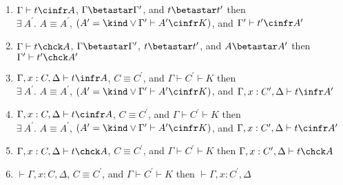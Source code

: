 \begin{theorem}
\begin{enumerate}
        \item $\Gamma \vdash t \cinfr A$, $\Gamma \betastar \Gamma^\prime$, and $t \betastar t^\prime$ then \\ $\exists\ A^\prime.$ $A \equiv A^\prime$, $(A^\prime = \kind \vee \Gamma^\prime \vdash A^\prime \cinfr K)$, and $\Gamma^\prime \vdash t^\prime \cinfr A^\prime$
        \item $\Gamma \vdash t \chck A$, $\Gamma \betastar \Gamma^\prime$, $t \betastar t^\prime$, and $A \betastar A^\prime$ then $\Gamma^\prime \vdash t^\prime \chck A^\prime$
        \item $\Gamma, x : C, \Delta \vdash t \infr A$, $C \equiv C^\prime$, and $\Gamma \vdash C^\prime \vdash K$ then \\ $\exists\ A^\prime.$ $A \equiv A^\prime$, $(A^\prime = \kind \vee \Gamma^\prime \vdash A^\prime \cinfr K)$, and $\Gamma, x : C^\prime, \Delta \vdash t\infr A^\prime$
        \item $\Gamma, x : C, \Delta \vdash t \cinfr A$, $C \equiv C^\prime$, and $\Gamma \vdash C^\prime \vdash K$  then \\ $\exists\ A^\prime.$ $A \equiv A^\prime$, $(A^\prime = \kind \vee \Gamma^\prime \vdash A^\prime \cinfr K)$, and $\Gamma, x : C^\prime, \Delta \vdash t \cinfr A^\prime$
        \item $\Gamma, x : C, \Delta \vdash t \chck A$, $C \equiv C^\prime$, and $\Gamma \vdash C^\prime \vdash K$  then $\Gamma, x : C^\prime, \Delta \vdash t \chck A$
        \item $\vdash \Gamma, x : C, \Delta$, $C \equiv C^\prime$, and $\Gamma \vdash C^\prime \vdash K$ then $\vdash \Gamma, x : C^\prime, \Delta$
    \end{enumerate}
\end{theorem}
